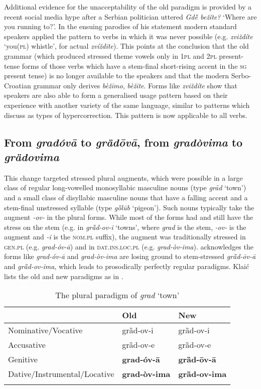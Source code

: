\documentclass[output=paper,modfonts,nonflat
]{langsci/langscibook}
\begin{document}
Additional evidence for the unacceptability of the old paradigm is provided by a recent social media hype after a Serbian politician uttered \textit{Gdȅ bežíte?} `Where are you running to?'. In the ensuing parodies of his statement modern standard speakers applied the pattern to verbs in which it was never possible (e.g. \textit{zviždíte} `you(\textsc{pl}) whistle', for actual \textit{zvíždīte}). This points at the conclusion that the old grammar (which produced stressed theme vowels only in 1\textsc{pl} and 2\textsc{pl} present-tense forms of those verbs which have a stem-final short-rising accent in the \textsc{sg}  present tense) is no longer available to the speakers and that the modern Serbo-Croatian grammar only derives \textit{bèžīmo}, \textit{bèžīte}. Forms like \textit{zviždíte} show that  speakers are also able to form a generalised usage pattern based on their experience with another variety of the same language, similar to patterns which \citet{Janda1994} discuss as types of hypercorrection. This pattern is now applicable to all verbs. 
\subsection{From \textit{gradóvā} to \textit{grȁdōvā}, from \textit{gradòvima} to \textit{grȁdovima}} \label{sec:kager:subsec23}

This change targeted stressed plural augments, which were possible in a large class of regular long-vowelled monosyllabic masculine nouns (type \textit{grȃd} `town’) and a small class of disyllabic masculine nouns that have a falling accent and a stem-final unstressed syllable (type \textit{gȍlūb} `pigeon’). Such nouns typically take the augment \textit{-ov-} in the plural forms. While most of the forms had and still have the stress on the stem (e.g. in \textit{grȁd-ov-i} `towns', where \textit{grad} is the stem, \textit{-ov-} is the augment and \textit{-i} is the \textsc{nom}.\textsc{pl} suffix), the augment was traditionally stressed in \textsc{gen}.\textsc{pl} (e.g. \textit{grad-óv-ā}) and in \textsc{dat}.\textsc{ins}.\textsc{loc}.\textsc{pl} (e.g. \textit{grad-òv-ima}). \citet[19--20]{Klaic2013} acknowledges the forms like \textit{grad-óv-ā} and \textit{grad-òv-ima} are losing ground to stem-stressed \textit{grȁd-ōv-ā} and \textit{grȁd-ov-ima}, which leads to prosodically perfectly regular paradigms.  Klaić lists the old and new paradigms as in  .

\begin{table}
\caption{The plural paradigm of \textit{grad} `town'}
\label{tab:kager:4}
 \begin{tabular}{  l  l  l }
 \lsptoprule
& Old & New\\ 
 \midrule
  Nominative/Vocative  &  grȁd-ov-i  &   grȁd-ov-i\\
  Accusative  &  grȁd-ov-e &grȁd-ov-e\\
Genitive  &  \textbf{grad-óv-ā}& \textbf{grȁd-ōv-ā}\\
Dative/Instrumental/Locative  & \textbf{grad-òv-ima}& \textbf{grȁd-ov-ima}\\
  \lspbottomrule
 \end{tabular}
\end{table}
\end{document}
